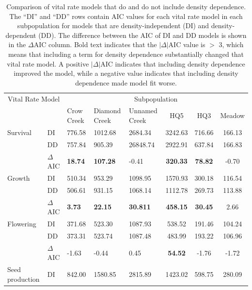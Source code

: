 \documentclass[12pt, letterpaper]{article}
\begin{document}
\begin{table}[h]
\centering
\begin{spacing}{1.2}
\caption{Comparison of vital rate models that do and do not include density dependence. The “DI” and “DD” rows contain AIC values for each vital rate model in each subpopulation for models that are density-independent (DI) and density-dependent (DD). The difference between the AIC of DI and DD models is shown in the $\Delta$AIC column. Bold text indicates that the $|\Delta|$AIC value is $>$ 3, which means that including a term for density dependence substantially changed that vital rate model. A positive $|\Delta|$AIC indicates that including density dependence improved the model, while a negative value indicates that including density dependence made model fit worse.\label{Table:DDModResults}}
\begin{tabular}{l l p{} p{} p{}ccc}
\toprule
\multicolumn{2}{c}{Vital Rate Model} & \multicolumn{6}{c}{Subpopulation} 
\\ \cline{3-8}
& & Crow Creek & Diamond Creek & Unnamed Creek & HQ5 & HQ3 & Meadow \\ 
\hline
\rowcolor[gray]{.95} Survival & DI &     776.58 &  1012.68 & 2684.34 & 3242.63 & 716.66 & 166.13 \\
\rowcolor[gray]{.95} & DD &              757.84 &  905.39  & 26848.74 & 2922.91 & 637.84 & 166.83 \\ 
\rowcolor[gray]{.95} & $\Delta$AIC &     \textbf{18.74} &   \textbf{107.28} &  -0.41 &   \textbf{320.33} &  \textbf{78.82} &   -0.70 \\ 
Growth & DI &                            510.34 &  953.29 &  1098.95 & 1570.93 & 300.18 & 116.54 \\
& DD &                                   506.61 &  931.15 &  1068.14 & 1112.78 & 269.73 & 113.88 \\
& $\Delta$AIC &                          \textbf{3.73} &    \textbf{22.15} &   \textbf{30.811} &  \textbf{458.15} &  \textbf{30.45} &  2.66 \\
\rowcolor[gray]{.95} Flowering & DI &    371.68 &  523.30 &  1087.93 & 538.52 &  191.46 & 104.24 \\
\rowcolor[gray]{.95} & DD &              373.31 &  523.74  & 1087.48 & 483.99 &  193.22 & 106.96 \\
\rowcolor[gray]{.95} & $\Delta$AIC &     -1.63 &   -0.44 &   0.45 &    \textbf{54.52} &   -1.76 &  -1.72 \\
Seed production & DI &                   842.00 &  1580.85 & 2815.89 & 1423.02 & 598.75 & 280.09 \\

\end{tabular}
\end{spacing}
\end{table}
\end{document}
